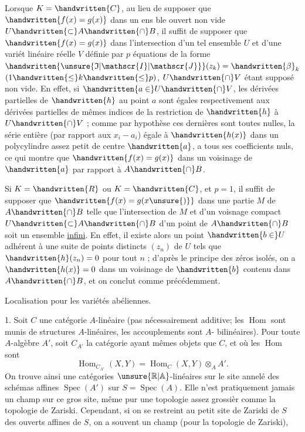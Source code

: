  Lorsque $K=\handwritten{C}$, au lieu de supposer que $\handwritten{f(x)=g(x)}$ dans un ens%
ble ouvert non vide $U\handwritten{\subset}A\handwritten{\cap}B$, il suffit de supposer que $\handwritten{f(x)=g(x)}$ dans l'intersection d'un tel ensemble $U$ et d'une variét linéaire réelle $V$ définie par $p$ équations de la forme $\handwritten{\unsure{\mathfrak{I}|\mathscr{I}|\mathscr{J}}}(z_k)=\handwritten{\beta}_k$ $(1\handwritten{\leq}k\handwritten{\leq}p)$, $U\handwritten{\cap}V$ étant supposé non vide. En effet, si $\handwritten{a\in}U\handwritten{\cap}V$, les dérivées partielles de $\handwritten{h}$ au point $a$ sont égales respectivement aux dérivées partielles de mêmes indices de la restriction de $\handwritten{h}$ à $U\handwritten{\cap}V$ ; comme par hypothèse ces dernières sont toutes nulles, la série entière (par rapport aux $x_i-a_i$) égale à $\handwritten{h(x)}$ dans un polycylindre assez petit de centre $\handwritten{a}$, a tous ses coefficients nuls, ce qui montre que $\handwritten{f(x)=g(x)}$ dans un voisina\handwritten{-}ge de $\handwritten{a}$ par rapport à $A\handwritten{\cap}B$.

Si $K=\handwritten{R}$ ou $K=\handwritten{C}$, et $p=1$, il suffit de supposer que $\handwritten{f(x)=g(x\unsure{)}}$ dans une partie $M$ de $A\handwritten{\cap}B$ telle que l'intersection de $M$ et d'un voisna\handwritten{-}ge compact $U\handwritten{\subset}A\handwritten{\cap}B$ d'un point de $A\handwritten{\cap}B$ soit un ensemble \uline{infini}. En effet, il existe alors un point $\handwritten{b\in}U$ adhérent à une suite de points distincts $(z_n)$ de $U$ tels que $\handwritten{h}(z_n)=0$ pour tout $n$ ; d'après le principe des zéros isolés, on a $\handwritten{h(x)}=0$ dans un voisinage de $\handwritten{b}$ contenu dans $A\handwritten{\cap}B$, et on conclut comme précédemment.


Localisation pour les variétés abéliennes.

1.\quad {} Soit $C$ une catégorie $A$-linéaire (pas nécessairement additive; les $\operatorname{Hom}$ sont munis de structures $A$-linéaires, les accouplements sont $A$- bilinéaires). Pour toute $A$-algèbre $A'$, soit $C_{A'}$ la catégorie ayant mêmes objets que $C$, et où les $\operatorname{Hom}$ sont
\[
\operatorname{Hom}_{C_{A'}}(X,Y)=\operatorname{Hom}_C(X,Y)\otimes_A A'.
\]
On trouve ainsi une catégories $\unsure{\mathbb{R}|\mathbb{A}}$-linéaires sur le site annelé des schémas affines $\operatorname{Spec}(A')$ sur $S=\operatorname{Spec}(A)$. Elle n'est pratiquement jamais un champ sur ce gros site, même pur une topologie assez grossièr comme la topologie de Zariski. Cependant, si on se restreint au petit site de Zariski  de $S$ des ouverts affines de $S$, on a souvent un champ (pour la topologie de Zariski),  

